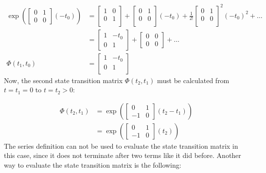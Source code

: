 \begin{example}
  \begin{equation*}
    \begin{split}
      \exp\left(
        \begin{bmatrix}
          0 & 1 \\ 0 & 0
        \end{bmatrix}(-t_{0})
      \right)&=
      \left[
        \begin{array}{cc}
          1 & 0 \\
          0 & 1 \\
        \end{array}
      \right]+
      \left[
        \begin{array}{cc}
          0 & 1 \\
          0 & 0 \\
        \end{array}
      \right](-t_{0})+\frac{1}{2!}
      \left[
        \begin{array}{cc}
          0 & 1 \\
          0 & 0 \\
        \end{array}
      \right]^{2}(-t_{0})^{2}+\ldots\\
      &=
      \begin{bmatrix}
        1 & -t_{0} \\ 0 & 1
      \end{bmatrix}+
      \begin{bmatrix}
        0 & 0 \\ 0 & 0
      \end{bmatrix} + \ldots\\
      \Phi(t_{1},t_{0})&=
      \begin{bmatrix}
        1 & -t_{0} \\ 0 & 1 \\
      \end{bmatrix}
    \end{split}
  \end{equation*}
  Now, the second state transition matrix $\Phi(t_{2},t_{1})$ must be calculated from $t=t_{1}=0$ to $t=t_{2}>0$:

  \begin{equation*}
    \begin{split}
      \Phi(t_{2},t_{1})
      &=\exp\left(
      \begin{bmatrix}
        0 & 1 \\ -1 & 0
      \end{bmatrix}(t_{2}-t_{1})
      \right) \\
      &=\exp\left(
      \begin{bmatrix}
        0 & 1 \\ -1 & 0
      \end{bmatrix}(t_{2})
      \right)
    \end{split}
  \end{equation*}
  The series definition can not be used to evaluate the state transition matrix in this case, since it does not terminate after two terms like it did before.
  Another way to evaluate the state transition matrix is the following:


\end{example}
